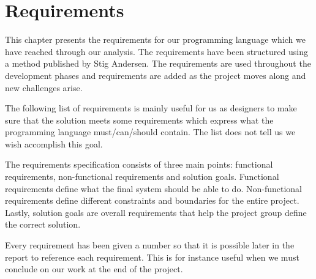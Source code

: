 \chapter{Requirements}
\label{chap:requirements}
This chapter presents the requirements for our programming language which we
have reached through our analysis. The requirements have been structured using a
method published by Stig Andersen\cite{requirementsGuide}. The requirements are
used throughout the development phases and requirements are added as the project
moves along and new challenges arise. 


The following list of requirements is mainly useful for us as designers to make
sure that the solution meets some requirements which express what the
programming language must/can/should contain. The list does not tell us we wish
accomplish this goal.

The requirements specification consists of three main points: functional
requirements, non-functional requirements and solution goals. Functional
requirements define what the final system should be able to do. Non-functional
requirements define different constraints and boundaries for the entire project.
Lastly, solution goals are overall requirements that help the project group
define the correct solution\cite{requirementsGuide}.

Every requirement has been given a number so that it is possible later in the
report to reference each requirement. This is for instance useful when we must
conclude on our work at the end of the project.


